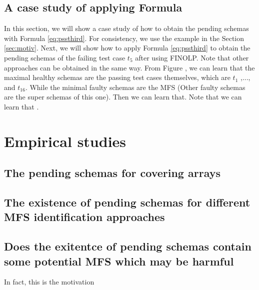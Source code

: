 {\subsection{A case study of applying Formula }
In this section, we will show a case study of how to obtain the pending schemas with Formula \ref{eq:pssthird}. For consistency, we use the example in the Section \ref{sec:motiv}. Next, we will show how to  apply Formula \ref{eq:pssthird} to obtain the pending schemas of the failing test case $t_{5}$ after using FINOLP. Note that other approaches can be obtained in the same way.
From Figure , we can learn that the maximal healthy schemas are the passing test cases themselves, which are $t_{1}$ ,..., and $t_{16}$. While the minimal faulty schemas are the MFS  (Other faulty schemas are the super schemas of this one).
Then we can learn that.  Note that we can learn that .




\section{Empirical studies}\label{sec:emp}


\subsection{The pending schemas for covering arrays}

%

\subsection{The existence of pending schemas for different MFS identification approaches}

%

\subsection{Does the exitentce of pending schemas contain some potential MFS which may be harmful}
In fact, this is the motivation


}
